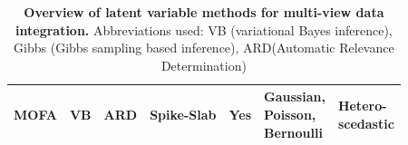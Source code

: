 \begin{table}[H]
\begin{tabular}{@{}lllllll}
		MOFA  & VB & ARD & Spike-Slab & Yes & \parbox{2cm}{Gaussian,\\Poisson,\\Bernoulli} & \parbox{2cm}{Hetero-\\scedastic} \\  \bottomrule
	\end{tabular}
	\caption{\textbf{Overview of latent variable methods for multi-view data integration.} Abbreviations used: VB (variational Bayes inference), Gibbs (Gibbs sampling based inference), ARD(Automatic Relevance Determination)}
	\label{GFAtable}
								
\end{table}


